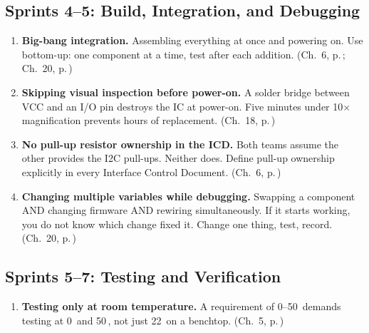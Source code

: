 \subsection*{Sprints 4--5: Build, Integration, and Debugging}

\begin{enumerate}[leftmargin=1.5em,resume]

\item \textbf{Big-bang integration.} Assembling everything at once and powering on. Use bottom-up: one component at a time, test after each addition. (Ch.~6, p.\,\pageref{ch:integration}; Ch.~20, p.\,\pageref{ch:debug})

\item \textbf{Skipping visual inspection before power-on.} A solder bridge between VCC and an I/O pin destroys the IC at power-on. Five minutes under 10$\times$ magnification prevents hours of replacement. (Ch.~18, p.\,\pageref{ch:pcb})

\item \textbf{No pull-up resistor ownership in the ICD.} Both teams assume the other provides the I2C pull-ups. Neither does. Define pull-up ownership explicitly in every Interface Control Document. (Ch.~6, p.\,\pageref{ch:integration})

\item \textbf{Changing multiple variables while debugging.} Swapping a component AND changing firmware AND rewiring simultaneously. If it starts working, you do not know which change fixed it. Change one thing, test, record. (Ch.~20, p.\,\pageref{ch:debug})

\end{enumerate}

\subsection*{Sprints 5--7: Testing and Verification}

\begin{enumerate}[leftmargin=1.5em,resume]

\item \textbf{Testing only at room temperature.} A requirement of 0--50\,\degC{} demands testing at 0\,\degC{} and 50\,\degC{}, not just 22\,\degC{} on a benchtop. (Ch.~5, p.\,\pageref{ch:vv})

\end{enumerate}

